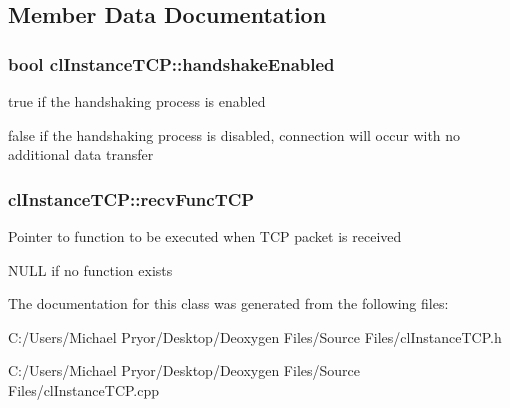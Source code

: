 \subsection{Member Data Documentation}
\hypertarget{classcl_instance_t_c_p_a4a35647e926d2c2c5abec877242f69fa}{
\subsubsection[{handshakeEnabled}]{\setlength{\rightskip}{0pt plus 5cm}bool {\bf clInstanceTCP::handshakeEnabled}}}
\label{classcl_instance_t_c_p_a4a35647e926d2c2c5abec877242f69fa}
true if the handshaking process is enabled \par
 false if the handshaking process is disabled, connection will occur with no additional data transfer \hypertarget{classcl_instance_t_c_p_aae4ec2a4dd6ac904c67e53c0620e2843}{
\subsubsection[{recvFuncTCP}]{ {\bf clInstanceTCP::recvFuncTCP}}}
\label{classcl_instance_t_c_p_aae4ec2a4dd6ac904c67e53c0620e2843}
Pointer to function to be executed when TCP packet is received \par
 NULL if no function exists 

The documentation for this class was generated from the following files:\begin{DoxyCompactItemize}
\item 
C:/Users/Michael Pryor/Desktop/Deoxygen Files/Source Files/clInstanceTCP.h\item 
C:/Users/Michael Pryor/Desktop/Deoxygen Files/Source Files/clInstanceTCP.cpp\end{DoxyCompactItemize}
